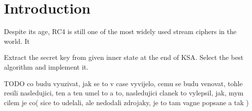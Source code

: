 \chapter*{Introduction}

Despite its age, RC4 is still one of the most widely used stream ciphers in the world. It 




Extract the secret key from given inner state at the end of KSA. Select the best algorithm and implement it.


TODO co budu vyuzivat, jak se to v case vyvijelo, cemu se budu venovat, tohle resili nasledujici, ten a ten umel to a to, nasledujici clanek to vylepsil, jak, mym cilem je co( sice to udelali, ale nedodali zdrojaky, je to tam vagne popsane a tak )
